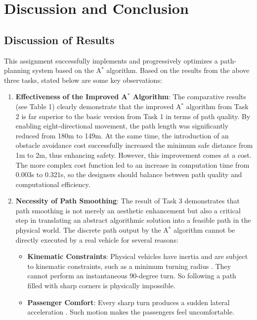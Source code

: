 \documentclass[aps,letterpaper,10pt]{revtex4}
\begin{document}
\newpage
\section{Discussion and Conclusion}

\subsection{Discussion of Results}
This assignment successfully implements and progressively optimizes a path-planning system based on the A$^*$ algorithm. Based on the results from the above three tasks, stated below are some key observations:

\begin{enumerate}
    \item \textbf{Effectiveness of the Improved A$^*$ Algorithm}: The comparative results (see Table 1) clearly demonstrate that the improved A$^*$ algorithm from Task 2 is far superior to the basic version from Task 1 in terms of path quality. By enabling eight-directional movement, the path length was significantly reduced from 180m to 149m. At the same time, the introduction of an obstacle avoidance cost successfully increased the minimum safe distance from 1m to 2m, thus enhancing safety. However, this improvement comes at a cost. The more complex cost function led to an increase in computation time from 0.003s to 0.321s, so the designers should balance between path quality and computational efficiency.

    \item \textbf{Necessity of Path Smoothing}: The result of Task 3 demonstrates that path smoothing is not merely an aesthetic enhancement but also a critical step in translating an abstract algorithmic solution into a feasible path in the physical world. The discrete path output by the A$^*$ algorithm cannot be directly executed by a real vehicle for several reasons:
    \begin{itemize}
        \item \textbf{Kinematic Constraints}: Physical vehicles have inertia and are subject to kinematic constraints, such as a minimum turning radius . They cannot perform an instantaneous 90-degree turn. So following a path filled with sharp corners is physically impossible.
        
        \item \textbf{Passenger Comfort}: Every sharp turn produces a sudden lateral acceleration . Such motion makes the passengers feel uncomfortable.   
    \end{itemize}
\end{enumerate}
\end{document}
